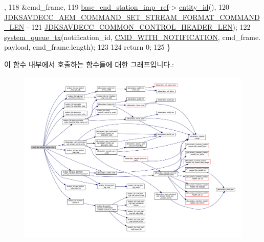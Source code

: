 \begin{DoxyCode}
      ,
118                                                        &cmd\_frame,
119                                                        \hyperlink{classavdecc__lib_1_1descriptor__base__imp_a550c969411f5f3b69f55cc139763d224}{base\_end\_station\_imp\_ref}->
      \hyperlink{classavdecc__lib_1_1end__station__imp_a363b6c9664a0d701def9b17863e20ad3}{entity\_id}(),
120                                                        
      \hyperlink{group__command__set__stream__format_ga54f70043611f17ce7ca3c27c68a02fa6}{JDKSAVDECC\_AEM\_COMMAND\_SET\_STREAM\_FORMAT\_COMMAND\_LEN} -
121                                                            
      \hyperlink{group__jdksavdecc__avtp__common__control__header_gaae84052886fb1bb42f3bc5f85b741dff}{JDKSAVDECC\_COMMON\_CONTROL\_HEADER\_LEN});
122     \hyperlink{namespaceavdecc__lib_a6dd511685627c0865a3442b539a4e8e9}{system\_queue\_tx}(notification\_id, \hyperlink{namespaceavdecc__lib_aabcadff06aa62be0ce47bc0646823604aba48b8a017e06fb240b650cdea965178}{CMD\_WITH\_NOTIFICATION}, cmd\_frame.
      payload, cmd\_frame.length);
123 
124     \textcolor{keywordflow}{return} 0;
125 \}
\end{DoxyCode}


이 함수 내부에서 호출하는 함수들에 대한 그래프입니다.\+:
\nopagebreak
\begin{figure}[H]
\begin{center}
\leavevmode
\includegraphics[width=350pt]{classavdecc__lib_1_1stream__input__descriptor__imp_ad5c08ba242703c9d0f6cab2b08d6aad6_cgraph}
\end{center}
\end{figure}


